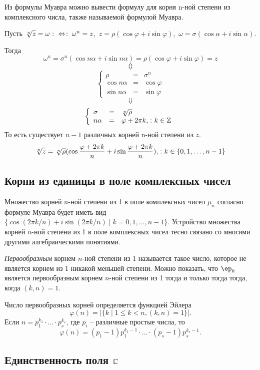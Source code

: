 Из формулы Муавра можно вывести формулу для корня n-ной степени из комплексного числа, также называемой формулой Муавра.

Пусть 
$\sqrt[n]{z} = \omega \lra \omega^n\bw=z$,\  $z=\rho(\cos\varphi+i\sin\varphi)$,\ $\omega=\sigma(\cos\alpha+i\sin\alpha)$.

Тогда
$$\omega^n=\sigma^n(\cos n\alpha+i\sin n\alpha)=\rho(\cos\varphi+i\sin\varphi)=z$$
$$\Updownarrow$$
$$
 \left\{
  \begin{array}{lcl}
   \rho&=&\sigma^n\\
   \cos n\alpha&=&\cos\varphi\\
   \sin n\alpha&=&\sin\varphi
  \end{array}
 \right.
$$ 
$$\Downarrow$$
$$
 \left\{
  \begin{array}{lcl}
   \sigma&=&\sqrt[n]{\rho}\\
   n\alpha&=&\varphi+2\pi k,\colon k\in\mathbb Z
  \end{array}
 \right.
$$
То есть существует $n-1$ различных корней n-ной степени из $z$.
$$\sqrt[n]{z}=\sqrt[n]{\rho}(\cos \frac{\varphi+2\pi k}{n}+i\sin \frac{\varphi+2\pi k}{n}),\colon k\in\{0,1,\dots ,n-1\} $$

\subsection{Корни из единицы в поле комплексных чисел}

Множество корней $n$-ной степени из 1 в поле комплексных чисел $\mu_n$ согласно формуле Муавра будет иметь вид $\{\cos(2\pi k/n)+i\sin(2\pi k/n)\mid k=0,1,\dots,n-1\}$. Устройство множества корней $n$-ной степени из 1 в поле комплексных чисел тесно связано со многими другими алгебраическими понятиями.

\begin{df}
  \emph{Первообразным} корнем $n$-ной степени из 1 называется такое число, которое не является корнем из 1 никакой меньшей степени. Можно показать, что $\ep_k$ является первообразным корнем $n$-ной степени из 1 тогда и только тогда тогда, когда $(k,n)=1$.
  
  Число первообразных корней определяется функцией Эйлера $$\varphi(n)=|\{k\mid 1\le k<n, (k,n)=1\}|.$$ Если $n=p_1^{k_1}\cdot\dots\cdot p_s^{k_s}$, где $p_i$ -- различные простые числа, то $$\varphi(n)=(p_1-1)p_1^{k_1-1}\cdot\dots\cdot (p_s-1)p_s^{k_s-1}.$$
\end{df}

\subsection{Единственность поля $\mathbb{C}$}

